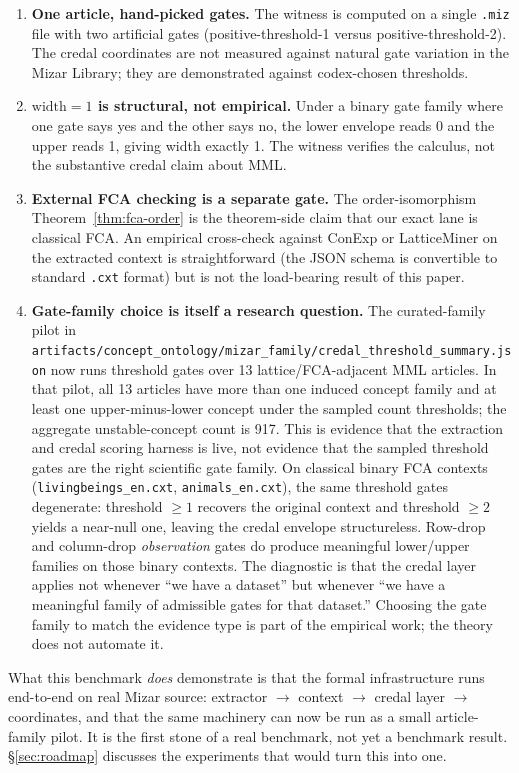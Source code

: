 \documentclass[]{article}
\newcommand{\lid}[1]{{\ttfamily\nolinkurl{#1}}}
\newcommand{\lpath}[1]{\texttt{\nolinkurl{#1}}}
\begin{document}
\begin{enumerate}
\item \textbf{One article, hand-picked gates.} The witness is computed on a single
\lid{.miz} file with two artificial gates (positive-threshold-1 versus
positive-threshold-2). The credal coordinates are not measured against natural
gate variation in the Mizar Library; they are demonstrated against codex-chosen
thresholds.
\item \textbf{$\mathrm{width} = 1$ is structural, not empirical.} Under a binary
gate family where one gate says yes and the other says no, the lower envelope reads
0 and the upper reads 1, giving width exactly 1. The witness verifies the calculus,
not the substantive credal claim about MML.
\item \textbf{External FCA checking is a separate gate.} The order-isomorphism
Theorem~\ref{thm:fca-order} is the theorem-side claim that our exact lane is
classical FCA. An empirical cross-check against ConExp or LatticeMiner on the
extracted context is straightforward (the JSON schema is convertible to standard
\lid{.cxt} format) but is not the load-bearing result of this paper.
\item \textbf{Gate-family choice is itself a research question.}
The curated-family pilot in
\lpath{artifacts/concept\_ontology/mizar\_family/credal\_threshold\_summary.json}
now runs threshold gates over 13 lattice/FCA-adjacent MML articles. In that pilot,
all 13 articles have more than one induced concept family and at least one
upper-minus-lower concept under the sampled count thresholds; the aggregate
unstable-concept count is 917. This is evidence that the extraction and credal
scoring harness is live, not evidence that the sampled threshold gates are the
right scientific gate family. On classical binary FCA contexts
(\lid{livingbeings\_en.cxt}, \lid{animals\_en.cxt}), the same threshold gates
degenerate: threshold $\geq 1$ recovers the original context and threshold $\geq 2$
yields a near-null one, leaving the credal envelope structureless. Row-drop and
column-drop \emph{observation} gates do produce meaningful lower/upper families on
those binary contexts. The diagnostic is that the credal layer applies not whenever
``we have a dataset'' but whenever ``we have a meaningful family of admissible
gates for that dataset.'' Choosing the gate family to match the evidence type
is part of the empirical work; the theory does not automate it.
\end{enumerate}

\noindent What this benchmark \emph{does} demonstrate is that the formal
infrastructure runs end-to-end on real Mizar source: extractor $\to$ context
$\to$ credal layer $\to$ coordinates, and that the same machinery can now be run
as a small article-family pilot. It is the first stone of a real benchmark,
not yet a benchmark result. \S\ref{sec:roadmap} discusses the experiments that
would turn this into one.
\end{document}
